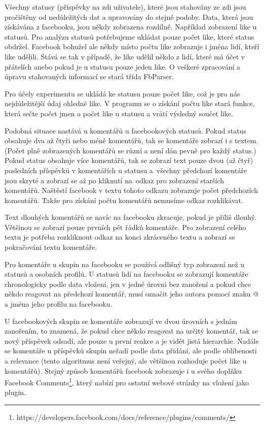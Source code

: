 \documentclass[thesis=M,czech]{FITthesis}[2013/05/10]
\begin{document}
Všechny statusy (příspěvky na zdi uživatele), které jsou stahovány ze zdi jsou pročištěny od nedůležitých dat a upravovány do stejné podoby. Data, která jsou získávána z facebooku, jsou někdy zobrazena rozdílně. Například zobrazení like u statusů. Pro analýzu statusů potřebujeme ukládat pouze počet like, které status obdržel. Facebook bohužel ale někdy místo počtu like zobrazuje i jména lidí, kteří like udělili. Stává se tak v případě, že like udělil někdo z lidí, které má účet v přátelích anebo pokud je u statusu pouze jeden like. O veškeré zpracování a úpravu stahovaných informací se stará třída FbParser.

Pro účely experimentu se ukládá ke statusu pouze počet like, což je pro nás nejdůležitější údaj ohledně like. V programu se o získání počtu like stará funkce, která sečte počet jmen a počet like u statusu a vrátí výsledný součet like. 

Podobná situace nastává u komentářů u facebookových statusů. Pokud status obsahuje dva až čtyři nebo méně komentářů, tak se komentáře zobrazí i s textem. (Počet plně zobrazených komentářů se různí a není dán pevně pro každý status.) Pokud status obsahuje  více komentářů, tak se zobrazí text pouze dvou (až čtyř) posledních příspěvků v komentářích u statusu a~všechny předchozí komentáře jsou skryté a zobrazí se až po kliknutí na~odkaz pro zobrazení starších komentářů. Naštěstí facebook v textu tohoto odkazu zobrazuje počet předchozích komentářů. Takže pro získání počtu komentářů nemusíme odkaz rozklikávat. 

Text dlouhých komentářů se navíc na facebooku zkracuje, pokud je příliš dlouhý. Většinou se zobrazí pouze prvních pět řádků komentáře. Pro zobrazení celého textu je potřeba rozkliknout odkaz na konci zkráceného textu a zobrazí se pokračování textu komentáře. 

Pro komentáře u skupin na facebooku se používá odlišný typ zobrazení než u statusů a osobních profilů. U statusů lidí na facebooku se zobrazují komentáře chronologicky podle data vložení, jen v jedné úrovni bez zanoření a pokud chce někdo reagovat na předchozí komentář, musí označit jeho autora pomocí znaku @ a jména jeho profilu na facebooku. 

U facebookových skupin se komentáře zobrazují ve dvou úrovních s jedním zanořením, to znamená, že pokud chce někdo reagovat na určitý komentář, tak se nový příspěvek odsadí, ale pouze u první reakce a je vidět jistá hierarchie. Nadále se komentáře u příspěvků skupin neřadí podle data přidání, ale podle oblíbenosti a relevance (tento algoritmus není veřejný, ale většinou rozhoduje počet like u komentářů). Stejný způsob komentářů facebook zobrazuje i u svého doplňku Facebook Comments\footnote{https://developers.facebook.com/docs/reference/plugins/comments/}, který nabízí pro ostatní webové stránky na vložení jako plugin. 
\end{document}
